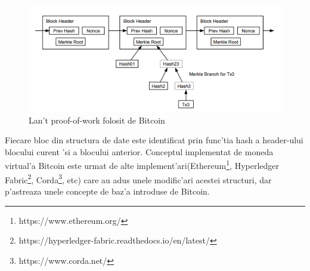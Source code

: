 \documentclass[12pt,a4paper,twoside]{report}
\begin{document}
		\begin{figure}[H]
		\begin{center}
			\includegraphics[scale=2.5]{img/btc.png}
			\caption{Lan't proof-of-work folosit de Bitcoin\cite{bitcoin}}
  			\label{fig:btc}
  		\end{center}
  		\end{figure} 
	
	
	
	Fiecare bloc din structura de date este identificat prin func'tia hash a header-ului blocului curent 'si a blocului anterior. Conceptul implementat de moneda virtual'a Bitcoin este urmat de alte implement'ari(Ethereum\footnote{https://www.ethereum.org/}, Hyperledger Fabric\footnote{https://hyperledger-fabric.readthedocs.io/en/latest/}, Corda\footnote{https://www.corda.net/}, etc) care au adus unele modific'ari acestei structuri, dar p'astreaza unele concepte de baz'a introduse de Bitcoin. 
\end{document}
